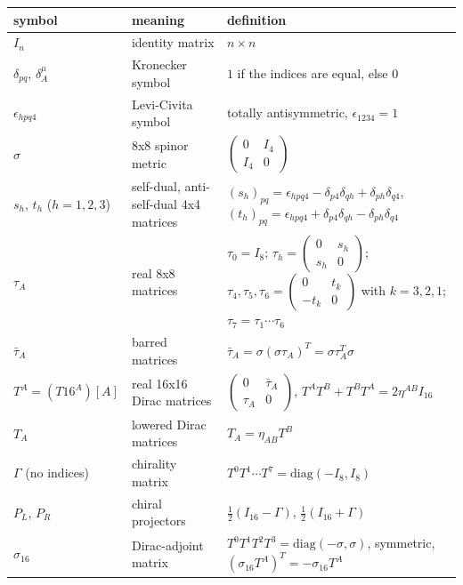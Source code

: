 \documentclass[10pt]{article}
\begin{document}
{\small\begin{longtable}{>{\raggedright\arraybackslash}p{}>{\raggedright\arraybackslash}p{}>{\raggedright\arraybackslash}p{}}\toprule
symbol & meaning & definition \\\midrule\endhead
\bottomrule\endfoot
$I_n$ & identity matrix & $n\times n$ \\
$\delta_{pq}$, $\delta_A^\mu$ & Kronecker symbol & $1$ if the indices are equal, else $0$ \\
$\epsilon_{hpq4}$ & Levi-Civita symbol & totally antisymmetric, $\epsilon_{1234} = 1$ \\
$\sigma$ & 8x8 spinor metric & $\begin{pmatrix}0 & I_4\\ I_4 & 0\end{pmatrix}$ \\
$s_h$, $t_h$ ($h = 1,2,3$) & self-dual, anti-self-dual 4x4 matrices & $(s_h)_{pq} = \epsilon_{hpq4} - \delta_{p4}\delta_{qh} + \delta_{ph}\delta_{q4}$, $(t_h)_{pq} = \epsilon_{hpq4} + \delta_{p4}\delta_{qh} - \delta_{ph}\delta_{q4}$ \\
$\tau_A$ & real 8x8 matrices & $\tau_0 = I_8$; $\tau_h = \begin{pmatrix}0 & s_h\\ s_h & 0\end{pmatrix}$; $\tau_4, \tau_5, \tau_6 = \begin{pmatrix}0 & t_k\\ -t_k & 0\end{pmatrix}$ with $k = 3, 2, 1$; $\tau_7 = \tau_1\cdots\tau_6$ \\
$\bar\tau_A$ & barred matrices & $\bar\tau_A = \sigma(\sigma\tau_A)^T = \sigma\tau_A^T\sigma$ \\
$T^A = (T16^A)[A]$ & real 16x16 Dirac matrices & $\begin{pmatrix}0 & \bar\tau_A\\ \tau_A & 0\end{pmatrix}$, $T^AT^B + T^BT^A = 2\eta^{AB}I_{16}$ \\
$T_A$ & lowered Dirac matrices & $T_A = \eta_{AB}T^B$ \\
$\Gamma$ (no indices) & chirality matrix & $T^0T^1\cdots T^7 = \mathrm{diag}(-I_8, I_8)$ \\
$P_L$, $P_R$ & chiral projectors & $\frac12(I_{16} - \Gamma)$, $\frac12(I_{16} + \Gamma)$ \\
$\sigma_{16}$ & Dirac-adjoint matrix & $T^0T^1T^2T^3 = \mathrm{diag}(-\sigma, \sigma)$, symmetric, $(\sigma_{16}T^A)^T = -\sigma_{16}T^A$ \\

\end{longtable}}
\end{document}
